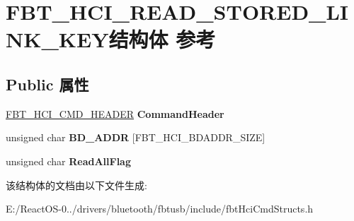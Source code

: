 \hypertarget{struct_f_b_t___h_c_i___r_e_a_d___s_t_o_r_e_d___l_i_n_k___k_e_y}{}\section{F\+B\+T\+\_\+\+H\+C\+I\+\_\+\+R\+E\+A\+D\+\_\+\+S\+T\+O\+R\+E\+D\+\_\+\+L\+I\+N\+K\+\_\+\+K\+E\+Y结构体 参考}
\label{struct_f_b_t___h_c_i___r_e_a_d___s_t_o_r_e_d___l_i_n_k___k_e_y}
\subsection*{Public 属性}
\begin{DoxyCompactItemize}
\item 
\mbox{\label{struct_f_b_t___h_c_i___r_e_a_d___s_t_o_r_e_d___l_i_n_k___k_e_y_a4be46adf77450c1a875973dfcbbfd890}} 
\hyperlink{struct_f_b_t___h_c_i___c_m_d___h_e_a_d_e_r}{F\+B\+T\+\_\+\+H\+C\+I\+\_\+\+C\+M\+D\+\_\+\+H\+E\+A\+D\+ER} {\bfseries Command\+Header}
\item 
\mbox{\label{struct_f_b_t___h_c_i___r_e_a_d___s_t_o_r_e_d___l_i_n_k___k_e_y_aa11a8a078a29972c82ec329302e6f4a5}} 
unsigned char {\bfseries B\+D\+\_\+\+A\+D\+DR} \mbox{[}F\+B\+T\+\_\+\+H\+C\+I\+\_\+\+B\+D\+A\+D\+D\+R\+\_\+\+S\+I\+ZE\mbox{]}
\item 
\mbox{\label{struct_f_b_t___h_c_i___r_e_a_d___s_t_o_r_e_d___l_i_n_k___k_e_y_a8485cfa72f28ece733a78ae7fcae1a57}} 
unsigned char {\bfseries Read\+All\+Flag}
\end{DoxyCompactItemize}


该结构体的文档由以下文件生成\+:\begin{DoxyCompactItemize}
\item 
E\+:/\+React\+O\+S-\/0../drivers/bluetooth/fbtusb/include/fbt\+Hci\+Cmd\+Structs.\+h\end{DoxyCompactItemize}
